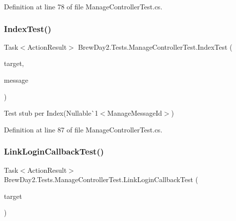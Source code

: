 Definition at line 78 of file Manage\+Controller\+Test.\+cs.

\mbox{\label{class_brew_day2_1_1_tests_1_1_manage_controller_test_a2a386a49ae6bce6c7efc13232132479e}} 
\subsubsection{\texorpdfstring{Index\+Test()}{IndexTest()}}
{\footnotesize\ttfamily Task$<$Action\+Result$>$ Brew\+Day2.\+Tests.\+Manage\+Controller\+Test.\+Index\+Test (\begin{DoxyParamCaption}\item[{\mbox{[}\+Pex\+Assume\+Under\+Test\mbox{]} \mbox{\hyperlink{class_brew_day2_1_1_controllers_1_1_manage_controller}{Manage\+Controller}}}]{target,  }\item[{\mbox{\hyperlink{class_brew_day2_1_1_controllers_1_1_manage_controller_a418038dc90e9d94606f474b9c06fd8c8}{Manage\+Controller.\+Manage\+Message\+Id}}?}]{message }\end{DoxyParamCaption})}



Test stub per Index(Nullable\`{}1$<$Manage\+Message\+Id$>$)



Definition at line 87 of file Manage\+Controller\+Test.\+cs.

\mbox{\label{class_brew_day2_1_1_tests_1_1_manage_controller_test_ad420c0783462e22703c44b9cc185f1aa}} 
\subsubsection{\texorpdfstring{Link\+Login\+Callback\+Test()}{LinkLoginCallbackTest()}}
{\footnotesize\ttfamily Task$<$Action\+Result$>$ Brew\+Day2.\+Tests.\+Manage\+Controller\+Test.\+Link\+Login\+Callback\+Test (\begin{DoxyParamCaption}\item[{\mbox{[}\+Pex\+Assume\+Under\+Test\mbox{]} \mbox{\hyperlink{class_brew_day2_1_1_controllers_1_1_manage_controller}{Manage\+Controller}}}]{target }\end{DoxyParamCaption})}



